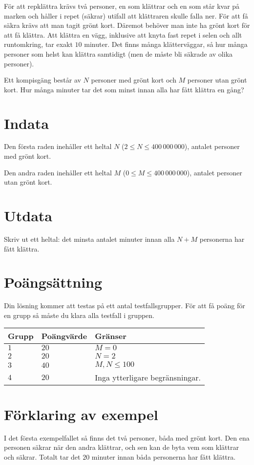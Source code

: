 För att repklättra krävs två personer, en som klättrar och en som står kvar på marken och håller i repet (säkrar) utifall att klättraren skulle falla ner.
För att få säkra krävs att man tagit grönt kort.
Däremot behöver man inte ha grönt kort för att få klättra.
Att klättra en vägg, inklusive att knyta fast repet i selen och allt runtomkring, tar exakt $10$ minuter.
Det finns många klätterväggar, så hur många personer som helst kan klättra samtidigt (men de måste bli säkrade av olika personer).

Ett kompisgäng består av $N$ personer med grönt kort och $M$ personer utan grönt kort. Hur många minuter tar det som minst innan alla har fått klättra en gång?

\section*{Indata}
Den första raden inehåller ett heltal $N$ ($2 \le N \le 400\,000\,000$), antalet personer med grönt kort.

Den andra raden inehåller ett heltal $M$ ($0 \le M \le 400\,000\,000$), antalet personer utan grönt kort.


\section*{Utdata}
Skriv ut ett heltal: det minsta antalet minuter innan alla $N+M$ personerna har fått klättra.

\section*{Poängsättning}
Din lösning kommer att testas på ett antal testfallsgrupper.
För att få poäng för en grupp så måste du klara alla testfall i gruppen.

\noindent
\begin{tabular}{| l | l | l |}
  \hline
  Grupp & Poängvärde & Gränser \\ \hline
  $1$   & $20$        & $M = 0$ \\ \hline
  $2$   & $20$        & $N = 2$ \\ \hline
  $3$   & $40$        & $M, N \le 100$ \\ \hline
  $4$   & $20$        & Inga ytterligare begränsningar. \\ \hline
\end{tabular}

\section*{Förklaring av exempel}
I det första exempelfallet så finns det två personer, båda med grönt kort.
Den ena personen säkrar när den andra klättrar, och sen kan de byta vem som klättrar och säkrar. 
Totalt tar det $20$ minuter innan båda personerna har fått klättra.

